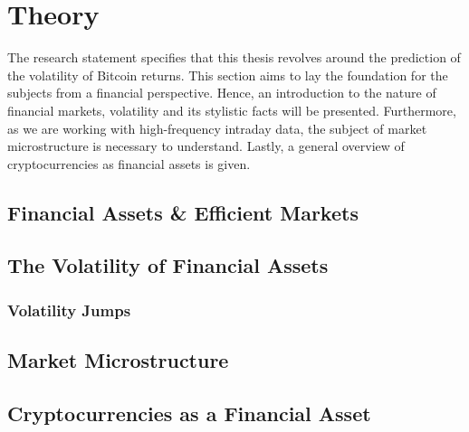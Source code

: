 \chapter{Theory}
\label{sec:orga7e1c8a}
The research statement specifies that this thesis revolves around the prediction of the volatility of Bitcoin returns.
This section aims to lay the foundation for the subjects from a financial perspective.
Hence, an introduction to the nature of financial markets, volatility and its stylistic facts will be presented.
Furthermore, as we are working with high-frequency intraday data, the subject of market microstructure is necessary to understand.
Lastly, a general overview of cryptocurrencies as financial assets is given.

\section{Financial Assets & Efficient Markets}
\label{sec:org1e911ea}


\section{The Volatility of Financial Assets}
\label{sec:org9e3d3c1}

\subsection{Volatility Jumps}
\label{sec:org349ks10}

\section{Market Microstructure}
\label{sec:org5e3d3c1}

\section{Cryptocurrencies as a Financial Asset}
\label{sec:org93ka01j}
